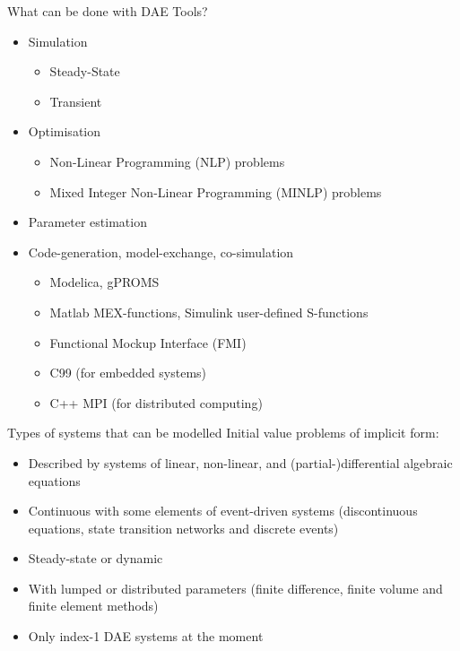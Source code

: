 \documentclass[compress,newPxFont,sthlmFooter]{beamer}
\begin{document}
\begin{frame}{What can be done with DAE Tools?} 
\begin{itemize}
  \item \alert{Simulation}
    \begin{itemize}
      \item Steady-State 
      \item Transient
    \end{itemize}
  \item \alert{Optimisation}
    \begin{itemize}
      \item Non-Linear Programming (NLP) problems
      \item Mixed Integer Non-Linear Programming (MINLP) problems
    \end{itemize}
  \item \alert{Parameter estimation}
  \item \alert{Code-generation}, \alert{model-exchange}, \alert{co-simulation} 
    \begin{itemize}
      \item Modelica, gPROMS
      \item Matlab MEX-functions, Simulink user-defined S-functions
      \item Functional Mockup Interface (FMI)
      \item C99 (for embedded systems)
      \item C++ MPI (for distributed computing) 
    \end{itemize}
\end{itemize}
\end{frame}

\begin{frame}{Types of systems that can be modelled}
  \alert{Initial value problems of implicit form}:
    \begin{itemize}
      \item Described by \alert{systems of linear, non-linear, and (partial-)differential} algebraic equations
      \item \alert{Continuous} with some elements of \alert{event-driven} systems 
            (discontinuous equations, state transition networks and discrete events) 
      \item \alert{Steady-state} or \alert{dynamic}
      \item With \alert{lumped} or \alert{distributed} parameters 
            (finite difference, finite volume and finite element methods)
      \item Only \alert{index-1} DAE systems at the moment
    \end{itemize}
\end{frame}
\end{document}
